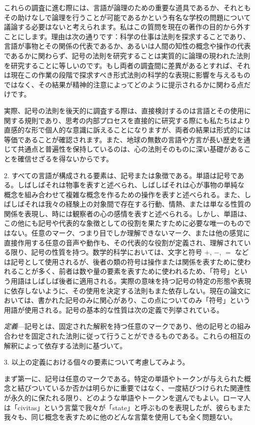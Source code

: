 \documentclass[a4paper,11pt,openany]{ltjsbook}
\begin{document}
これらの調査に進む際には、言語が論理のための重要な道具であるか、それともその助けなしで論理を行うことが可能であるかという有名な学校の問題について議論する必要はないと考えられます。私はこの質問を現在の著作の目的から外すことにします。理由は次の通りです：科学の仕事は法則を探求することであり、言語が事物とその関係の代表であるか、あるいは人間の知性の概念や操作の代表であるかに関わらず、記号の法則を研究することは実質的に論理の現われた法則を研究することに等しいのです。もし両者の調査間に差異があるとすれば、それは現在この作業の段階で探求すべき形式法則の科学的な表現に影響を与えるものではなく、その結果が精神的注意によってどのように提示されるかに関わる点だけです。

実際、記号の法則を後天的に調査する際は、直接検討するのは言語とその使用に関する規則であり、思考の内部プロセスを直接的に研究する際にも私たちはより直感的な形で個人的な意識に訴えることになりますが、両者の結果は形式的には等価であることが確認されます。また、地球の無数の言語や方言が長い歴史を通じて共通点と普遍性を保持しているのは、心の法則そのものに深い基礎があることを確信せざるを得ないからです。

2. すべての言語が構成される要素は、記号または象徴である。単語は記号である。しばしばそれは物事を表すと述べられ、しばしばそれは心が事物の単純な概念を組み合わせて複雑な概念を作るための操作を表すと述べられる。また、しばしばそれは我々の経験上の対象間で存在する行動、情熱、または単なる性質の関係を表現し、時には観察者の心の感情を表すと述べられる。しかし、単語は、この他にも記号や代表的な象徴としての役割を果たすために必要な唯一のものではない。任意のマーク、つまり目でしか理解できないマーク、または他の感覚に直接作用する任意の音声や動作も、その代表的な役割が定義され、理解されている限り、記号の性質を持つ。数学的科学においては、文字と符号 $+$, $-$, $=$ などは記号として使用されるが、後者の類の符号は操作または関係を表すために使われることが多く、前者は数や量の要素を表すために使われるため、「符号」という用語はしばしば後者に適用される。実際の意味を持つ記号の特定の形態や表現に依存しないように、その使用を決定する法則もまた依存しない。現在の論文においては、書かれた記号のみに関心があり、この点についてのみ「符号」という用語が使用される。記号の基本的な性質は次の定義で列挙されている。

\textit{定義}---記号とは、固定された解釈を持つ任意のマークであり、他の記号との組み合わせを固定された法則に従って行うことができるものである。これらの相互の解釈によって依存する法則に基づいて。

3. 以上の定義における個々の要素について考慮してみよう。

まず第一に、記号は任意のマークである。特定の単語やトークンが与えられた概念と結びついているか否かは明らかに重要ではなく、一度結びつけられた関連性が永久的に保たれる限り、どのような単語やトークンを選んでもよい。ローマ人は「civitas」という言葉で我々が「state」と呼ぶものを表現したが、彼らもまた我々も、同じ概念を表すために他のどんな言葉を使用しても全く問題ない。
\end{document}
